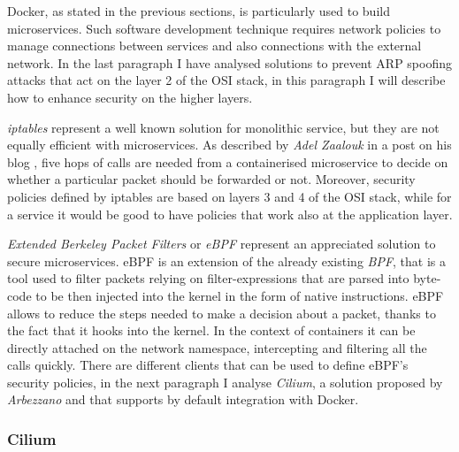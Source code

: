 \documentclass[a4paper,12pt]{article}
\begin{document}
Docker, as stated in the previous sections, is particularly used to build
microservices. Such software development technique requires network policies to
manage connections between services and also connections with the external
network. In the last paragraph I have analysed solutions to prevent ARP spoofing
attacks that act on the layer 2 of the OSI stack, in this paragraph I will
describe how to enhance security on the higher layers. \par \textit{iptables}
represent a well known solution for monolithic service, but they are not equally
efficient with microservices. As described by \textit{Adel Zaalouk} in a post on
his blog \cite{zaalouk_networking}, five hops of calls are needed from a
containerised microservice to decide on whether a particular packet should be
forwarded or not. Moreover, security policies defined by iptables are based on
layers 3 and 4 of the OSI stack, while for a service it would be good to have
policies that work also at the application layer. \par \textit{Extended Berkeley
Packet Filters} or \textit{eBPF} represent an appreciated solution to secure
microservices. eBPF is an extension of the already existing \textit{BPF}, that
is a tool used to filter packets relying on filter-expressions that are parsed
into byte-code to be then injected into the kernel in the form of native
instructions. eBPF allows to reduce the steps needed to make a decision about a
packet, thanks to the fact that it hooks into the kernel. In the context of
containers it can be directly attached on the network namespace, intercepting
and filtering all the calls quickly. There are different clients that can be
used to define eBPF's security policies, in the next paragraph I analyse
\textit{Cilium}, a solution proposed by \textit{Arbezzano}
\cite[Sec.~1.9]{arbezzano_play_safe} and that supports by default integration
with Docker.

\subsubsection{Cilium}
\end{document}
